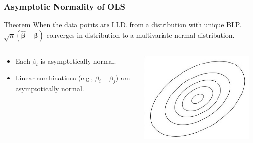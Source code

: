 \documentclass[12pt, block=fill]{beamer}
\begin{document}
\begin{frame}
  \frametitle{Asymptotic Normality of OLS}
  \begin{block}{Theorem}
  When the data points are I.I.D. from a distribution with unique
  BLP. $\sqrt{n}(\boldsymbol{\hat \beta} - \boldsymbol{\beta})$
  converges in distribution to a multivariate normal distribution. 
  \end{block}
  
  \begin{columns}
\begin{column}{0.7\textwidth}
  \begin{itemize}
\item Each $\beta_i$ is asymptotically normal.
\item Linear combinations (e.g., $\beta_i - \beta_j$) are asymptotically normal.
\end{itemize}\end{column}
\begin{column}{0.3\textwidth}
    \begin{center}
     \includegraphics[width=\textwidth]{images/normal}
     \end{center}
\end{column}
\end{columns}
 
\end{frame}
\end{document}

